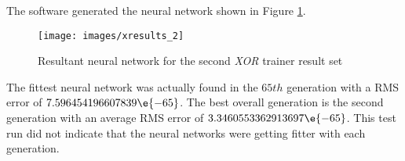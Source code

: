 The software generated the neural network shown in Figure \ref{xresults_2}.

\begin{figure}[h!]
  \centering
  \texttt{[image: images/xresults\_2]}
  \caption{Resultant neural network for the second {\it XOR} trainer result set}
  \label{xresults_2}
\end{figure}

The fittest neural network was actually found in the $65{th}$
generation with a RMS error of $7.596454196607839\e{-65}$.
The best overall generation is the second generation with an average
RMS error of $3.3460553362913697\e{-65}$.
This test run did not indicate that the neural networks were getting
fitter with each generation. 
